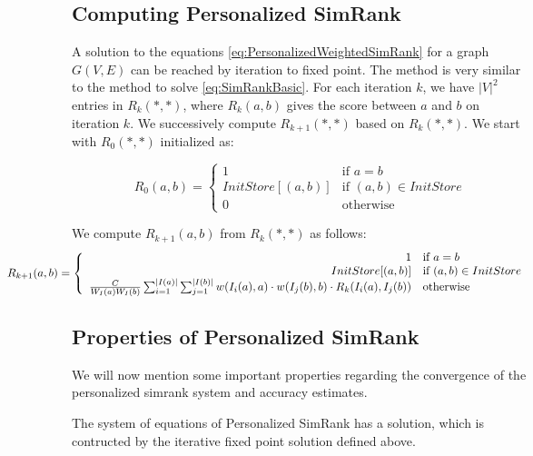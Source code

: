 \subsection{Computing Personalized SimRank}
A solution to the equations \ref{eq:PersonalizedWeightedSimRank} for a graph $G(V,E)$ can be reached by iteration to fixed point. The method is very similar to the method to solve \ref{eq:SimRankBasic}. For each iteration $k$, we have ${|V|}^2$ entries in $R_k(\ast, \ast)$, where $R_k(a,b)$ gives the score between $a$ and $b$ on iteration $k$.
We successively compute $R_{k+1}(\ast,\ast)$ based on $R_k(\ast,\ast)$. 
We start with $R_0(\ast,\ast)$ initialized as:

\begin{equation}
R_0(a,b) =
\left\{ \begin{array}{rl}
1 & \mbox{if } a=b\\
InitStore[(a,b)] & \mbox{if } (a,b) \in InitStore \\
0 & \mbox{otherwise }
\end{array}\right.
\end{equation}

\noindent
We compute $R_{k+1}(a,b)$ from $R_k(\ast,\ast)$ as follows:
\begin{equation} \label{eq:PersonalizedWeightedSimRankSolution}
\hspace*{-2cm} R_{k+1}(a,b) =
\left\{ \begin{array}{rl}
1 & \mbox{if } a=b\\
InitStore[(a,b)] & \mbox{if } (a,b) \in InitStore\\
\frac{C}{W_{I}(a)W_{I}(b)} \sum_{i=1}^{|I(a)|} \sum_{j=1}^{|I(b)|} w(I_i(a),a) \cdot w(I_j(b),b) \cdot R_k(I_i(a),I_j(b)) & \mbox{otherwise}
\end{array}\right.
\end{equation}

\subsection{Properties of Personalized SimRank}
We will now mention some important properties regarding the convergence of the personalized simrank system and accuracy estimates.

\begin{proposition}
The system of equations of Personalized SimRank has a solution, which is contructed by the iterative fixed point solution defined above. %
\end{proposition}

